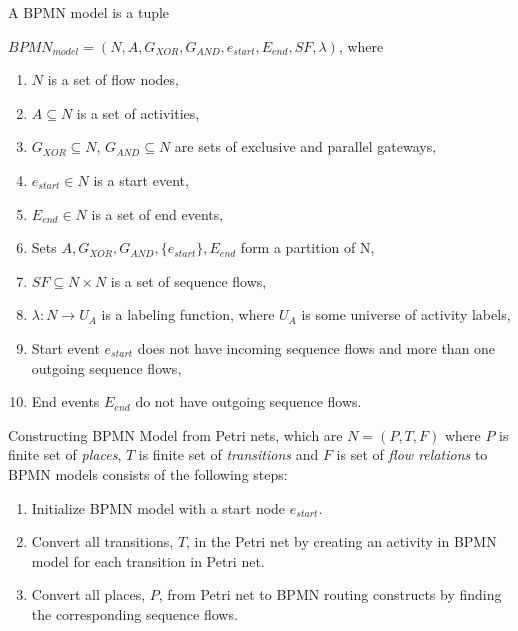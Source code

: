 \theoremstyle{definition}
\begin{definition}
A BPMN model is a tuple 

$BPMN_{model}=(N, A, G_{XOR}, G_{AND}, e_{start}, E_{end}, SF, \lambda)$, where
\begin{enumerate}
  \item $N$ is a set of flow nodes,
  \item $A \subseteq N$ is a set of activities,
  \item $G_{XOR} \subseteq N$, $G_{AND} \subseteq N$ are sets of exclusive and parallel gateways,
  \item $e_{start} \in N$ is a start event,
  \item $E_{end} \in N$ is a set of end events,
  \item Sets $A, G_{XOR}, G_{AND}, \{e_{start}\}, E_{end}$ form a partition of N,
  \item $SF \subseteq N \times N$ is a set of sequence flows,
  \item $\lambda : N \rightarrow U_{A}$ is a labeling function, where $U_{A}$ is some universe of activity labels,
  \item Start event $e_{start}$ does not have incoming sequence flows and more than one outgoing sequence flows,
  \item End events $E_{end}$ do not have outgoing sequence flows.  
\end{enumerate}
\end{definition}

\theoremstyle{definition}
\begin{definition}
Constructing BPMN Model from Petri nets, which are $N = (P, T, F)$ where $P$ is finite set of \textit{places}, $T$ is finite set of \textit{transitions} and $F$ is set of \textit{flow relations} to BPMN models consists of the following steps:
\begin{enumerate}
  \item Initialize BPMN model with a start node $e_{start}$.
  \item Convert all transitions, $T$, in the Petri net by creating an activity in BPMN model for each transition in Petri net.
  \item Convert all places, $P$, from Petri net to BPMN routing constructs by finding the corresponding sequence flows.
\end{enumerate}
\end{definition}


